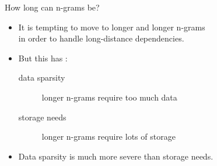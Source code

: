 \documentclass[professionalfonts, xcolor={usenames,svgnames,x11names,table}]{beamer}
\begin{document}
\begin{frame}{How long can n-grams be?}
    \begin{itemize}
        \item It is tempting to move to longer and longer n-grams\\
              in order to handle long-distance dependencies.
        \item But this has :
                \begin{description}
                    \item[data sparsity] longer n-grams require too much data
                    \item[storage needs] longer n-grams require lots of storage
                \end{description}
        \item Data sparsity is much more severe than storage needs.
    \end{itemize}    
\end{frame}
\end{document}
